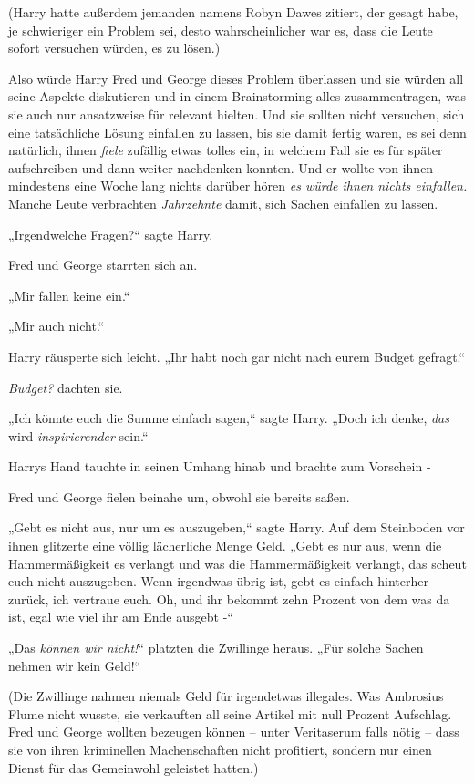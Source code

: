 {(Harry hatte außerdem jemanden namens Robyn Dawes zitiert, der gesagt habe, je schwieriger ein Problem sei, desto wahrscheinlicher war es, dass die Leute sofort versuchen würden, es zu lösen.)

Also würde Harry Fred und George dieses Problem überlassen und sie würden all seine Aspekte diskutieren und in einem Brainstorming alles zusammentragen, was sie auch nur ansatzweise für relevant hielten. Und sie sollten nicht versuchen, sich eine tatsächliche Lösung einfallen zu lassen, bis sie damit fertig waren, es sei denn natürlich, ihnen \emph{fiele} zufällig etwas tolles ein, in welchem Fall sie es für später aufschreiben und dann weiter nachdenken konnten. Und er wollte von ihnen mindestens eine Woche lang nichts darüber hören \emph{es würde ihnen nichts einfallen.} Manche Leute verbrachten \emph{Jahrzehnte} damit, sich Sachen einfallen zu lassen.

„Irgendwelche Fragen?“ sagte Harry.

Fred und George starrten sich an.

„Mir fallen keine ein.“

„Mir auch nicht.“

Harry räusperte sich leicht. „Ihr habt noch gar nicht nach eurem Budget gefragt.“

\emph{Budget?} dachten sie.

„Ich könnte euch die Summe einfach sagen,“ sagte Harry. „Doch ich denke, \emph{das} wird \emph{inspirierender} sein.“

Harrys Hand tauchte in seinen Umhang hinab und brachte zum Vorschein -

Fred und George fielen beinahe um, obwohl sie bereits saßen.

„Gebt es nicht aus, nur um es auszugeben,“ sagte Harry. Auf dem Steinboden vor ihnen glitzerte eine völlig lächerliche Menge Geld. „Gebt es nur aus, wenn die Hammermäßigkeit es verlangt und was die Hammermäßigkeit verlangt, das scheut euch nicht auszugeben. Wenn irgendwas übrig ist, gebt es einfach hinterher zurück, ich vertraue euch. Oh, und ihr bekommt zehn Prozent von dem was da ist, egal wie viel ihr am Ende ausgebt -“

„Das \emph{können wir nicht!}“ platzten die Zwillinge heraus. „Für solche Sachen nehmen wir kein Geld!“

(Die Zwillinge nahmen niemals Geld für irgendetwas illegales. Was Ambrosius Flume nicht wusste, sie verkauften all seine Artikel mit null Prozent Aufschlag. Fred und George wollten bezeugen können -- unter Veritaserum falls nötig -- dass sie von ihren kriminellen Machenschaften nicht profitiert, sondern nur einen Dienst für das Gemeinwohl geleistet hatten.)

}
